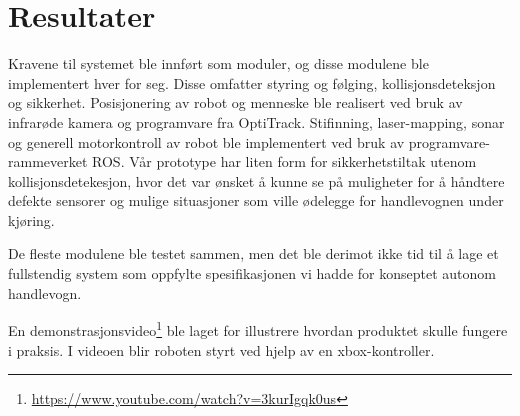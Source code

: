 
\chapter{Resultater} %

\label{ch:resultater} %

Kravene til systemet ble innført som moduler, og disse modulene ble implementert hver for seg. Disse omfatter styring og følging, kollisjonsdeteksjon og sikkerhet. Posisjonering av robot og menneske ble realisert ved bruk av infrarøde kamera og programvare fra OptiTrack. Stifinning, laser-mapping, sonar og generell motorkontroll av robot ble implementert ved bruk av programvare-rammeverket ROS. 
Vår prototype har liten form for sikkerhetstiltak utenom kollisjonsdetekesjon, hvor det var ønsket å kunne se på muligheter for å håndtere defekte sensorer og mulige situasjoner som ville ødelegge for handlevognen under kjøring.

De fleste modulene ble testet sammen, men det ble derimot ikke tid til å lage et fullstendig system som oppfylte spesifikasjonen vi hadde for konseptet autonom handlevogn.

En demonstrasjonsvideo\footnote{\url{https://www.youtube.com/watch?v=3kurIgqk0us}} ble laget for illustrere hvordan produktet skulle fungere i praksis. I videoen blir roboten styrt ved hjelp av en xbox-kontroller.  

